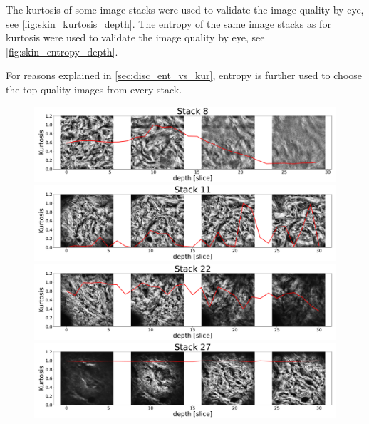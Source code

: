 The kurtosis of some image stacks were used to validate the image quality by eye, see \cref{fig:skin_kurtosis_depth}.
The entropy of the same image stacks as for kurtosis were used to validate the image quality by eye, see \cref{fig:skin_entropy_depth}.

For reasons explained in \cref{sec:disc_ent_vs_kur}, entropy is further used to choose the top quality images from every stack.

\begin{figure}
    \centering
    \includegraphics[width=\linewidth]{skinstression/images/kurtosis/8.pdf} \\
    \includegraphics[width=\linewidth]{skinstression/images/kurtosis/11.pdf} \\
    \includegraphics[width=\linewidth]{skinstression/images/kurtosis/22.pdf} \\
    \includegraphics[width=\linewidth]{skinstression/images/kurtosis/27.pdf} \\

\end{figure}
